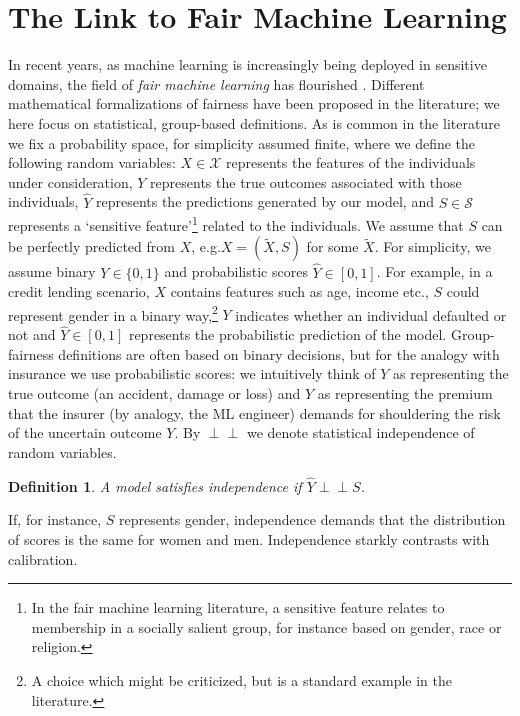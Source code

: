 \documentclass[11pt]{article} %
\makeatletter
\newcommand*{\eg}{e.g.\@\xspace}
\newcommand{\indep}{\perp \!\!\! \perp}
\newtheorem{definition}[theorem]{Definition}
\makeatother
\begin{document}
\section{The Link to Fair Machine Learning}
\label{sec:fairmllink}
In recent years, as machine learning is increasingly being deployed in sensitive domains, the field of \textit{fair machine learning} has flourished \citep{barocas-hardt-narayanan,mitchell2021algorithmic,mehrabi2021survey,castelnovo2022clarification}. Different mathematical formalizations of fairness have been proposed in the literature; we here focus on statistical, group-based definitions. 
As is common in the literature we fix a probability space, for simplicity assumed finite, where we define the following random variables: $X \in \mathcal{X}$ represents the features of the individuals under consideration, $Y$ represents the true outcomes associated with those individuals, $\hat{Y}$ represents the predictions generated by our model, and $S \in \mathcal{S}$ represents a `sensitive feature'\footnote{In the fair machine learning literature, a sensitive feature relates to membership in a socially salient group, for instance based on gender, race or religion.} related to the individuals. We assume that $S$ can be perfectly predicted from $X$, \eg $X=(\tilde{X},S)$ for some $\tilde{X}$.
For simplicity, we assume binary $Y \in \{0,1\}$ and probabilistic scores $\hat{Y} \in [0,1]$. For example, in a credit lending scenario, $X$ contains features such as age, income etc., $S$ could represent gender in a binary way,\footnote{A choice which might be criticized, but is a standard example in the literature.} $Y$ indicates whether an individual defaulted or not and $\hat{Y} \in [0,1]$ represents the probabilistic prediction of the model. Group-fairness definitions are often based on binary decisions, but for the analogy with insurance we use probabilistic scores: we intuitively think of $Y$ as representing the true outcome (an accident, damage or loss) and $\hat{Y}$ as representing the premium that the insurer (by analogy, the ML engineer) demands for shouldering the risk of the uncertain outcome $Y$. By $\indep$ we denote statistical independence of random variables.

\begin{definition}
\label{def:independence}
    A model satisfies \emph{independence} if \thinspace\thinspace $\hat{Y} \indep S $.
\end{definition}
If, for instance, $S$ represents gender, independence demands that the distribution of scores is the same for women and men. Independence starkly contrasts with calibration.
\end{document}
